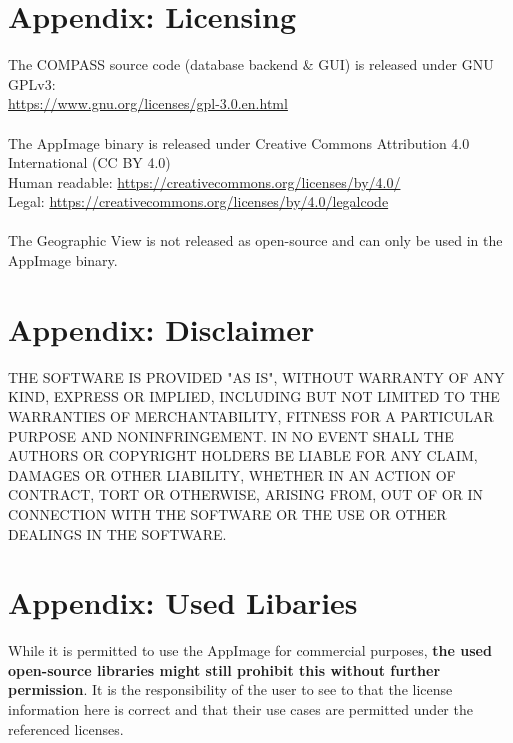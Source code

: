 \section{Appendix: Licensing}
\label{sec:appendix_licensing}

The COMPASS source code (database backend \& GUI) is released under GNU GPLv3: \\
\url{https://www.gnu.org/licenses/gpl-3.0.en.html} \\\\

The AppImage binary is released under Creative Commons Attribution 4.0 International (CC BY 4.0) \\
Human readable: \url{https://creativecommons.org/licenses/by/4.0/} \\
Legal: \url{https://creativecommons.org/licenses/by/4.0/legalcode} \\\\

The Geographic View is not released as open-source and can only be used in the AppImage binary.

\section{Appendix: Disclaimer}

THE SOFTWARE IS PROVIDED "AS IS", WITHOUT WARRANTY OF ANY KIND, EXPRESS OR IMPLIED, INCLUDING BUT NOT LIMITED TO THE WARRANTIES OF MERCHANTABILITY, FITNESS FOR A PARTICULAR PURPOSE AND NONINFRINGEMENT. IN NO EVENT SHALL THE AUTHORS OR COPYRIGHT HOLDERS BE LIABLE FOR ANY CLAIM, DAMAGES OR OTHER LIABILITY, WHETHER IN AN ACTION OF CONTRACT, TORT OR OTHERWISE, ARISING FROM, OUT OF OR IN CONNECTION WITH THE SOFTWARE OR THE USE OR OTHER DEALINGS IN THE SOFTWARE.

\section{Appendix: Used Libaries}

While it is permitted to use the AppImage for commercial purposes, \textbf{the used open-source libraries might still prohibit this without further permission}. It is the responsibility of the user to see to that the license information here is correct and that their use cases are permitted under the referenced licenses.

